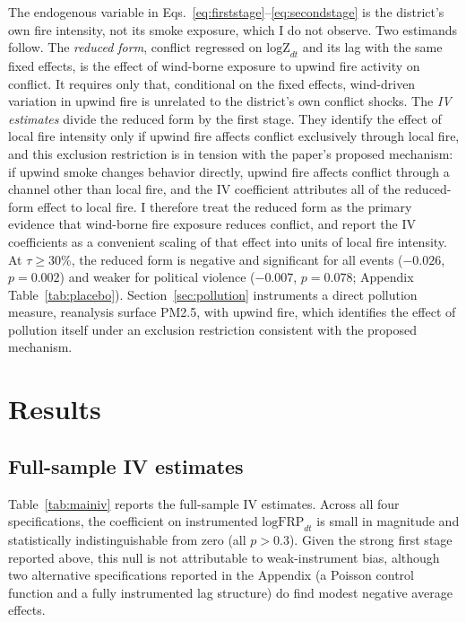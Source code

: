 \documentclass[12pt]{article}
\begin{document}
The endogenous variable in Eqs.~\eqref{eq:firststage}--\eqref{eq:secondstage} is the district's own fire intensity, not its smoke exposure, which I do not observe. Two estimands follow. The \emph{reduced form}, conflict regressed on $\text{logZ}_{dt}$ and its lag with the same fixed effects, is the effect of wind-borne exposure to upwind fire activity on conflict. It requires only that, conditional on the fixed effects, wind-driven variation in upwind fire is unrelated to the district's own conflict shocks. The \emph{IV estimates} divide the reduced form by the first stage. They identify the effect of local fire intensity only if upwind fire affects conflict exclusively through local fire, and this exclusion restriction is in tension with the paper's proposed mechanism: if upwind smoke changes behavior directly, upwind fire affects conflict through a channel other than local fire, and the IV coefficient attributes all of the reduced-form effect to local fire. I therefore treat the reduced form as the primary evidence that wind-borne fire exposure reduces conflict, and report the IV coefficients as a convenient scaling of that effect into units of local fire intensity. At $\tau \geq 30\%$, the reduced form is negative and significant for all events ($-0.026$, $p=0.002$) and weaker for political violence ($-0.007$, $p=0.078$; Appendix Table~\ref{tab:placebo}). Section~\ref{sec:pollution} instruments a direct pollution measure, reanalysis surface PM2.5, with upwind fire, which identifies the effect of pollution itself under an exclusion restriction consistent with the proposed mechanism.

\section{Results}
\label{sec:results}

\subsection{Full-sample IV estimates}

Table~\ref{tab:mainiv} reports the full-sample IV estimates. Across all four specifications, the coefficient on instrumented $\text{logFRP}_{dt}$ is small in magnitude and statistically indistinguishable from zero (all $p>0.3$). Given the strong first stage reported above, this null is not attributable to weak-instrument bias, although two alternative specifications reported in the Appendix (a Poisson control function and a fully instrumented lag structure) do find modest negative average effects.
\end{document}
